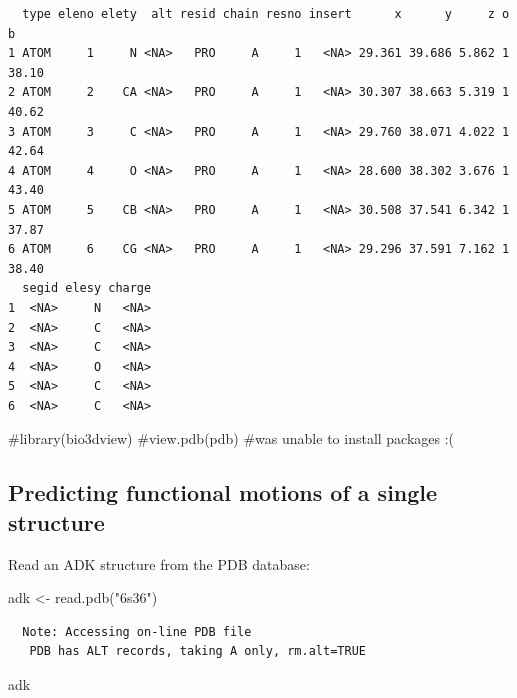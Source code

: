 \documentclass[
  letterpaper,
  DIV=11,
  numbers=noendperiod]{scrartcl}
\newenvironment{Shaded}{\begin{snugshade}}{\end{snugshade}}
\newcommand{\CommentTok}[1]{\textcolor[rgb]{0.37,0.37,0.37}{#1}}
\newcommand{\FunctionTok}[1]{\textcolor[rgb]{0.28,0.35,0.67}{#1}}
\newcommand{\NormalTok}[1]{\textcolor[rgb]{0.00,0.23,0.31}{#1}}
\newcommand{\OtherTok}[1]{\textcolor[rgb]{0.00,0.23,0.31}{#1}}
\newcommand{\StringTok}[1]{\textcolor[rgb]{0.13,0.47,0.30}{#1}}
\begin{document}
\begin{verbatim}
  type eleno elety  alt resid chain resno insert      x      y     z o     b
1 ATOM     1     N <NA>   PRO     A     1   <NA> 29.361 39.686 5.862 1 38.10
2 ATOM     2    CA <NA>   PRO     A     1   <NA> 30.307 38.663 5.319 1 40.62
3 ATOM     3     C <NA>   PRO     A     1   <NA> 29.760 38.071 4.022 1 42.64
4 ATOM     4     O <NA>   PRO     A     1   <NA> 28.600 38.302 3.676 1 43.40
5 ATOM     5    CB <NA>   PRO     A     1   <NA> 30.508 37.541 6.342 1 37.87
6 ATOM     6    CG <NA>   PRO     A     1   <NA> 29.296 37.591 7.162 1 38.40
  segid elesy charge
1  <NA>     N   <NA>
2  <NA>     C   <NA>
3  <NA>     C   <NA>
4  <NA>     O   <NA>
5  <NA>     C   <NA>
6  <NA>     C   <NA>
\end{verbatim}

\begin{Shaded}
\begin{Highlighting}[]
\CommentTok{\#library(bio3dview)}
\CommentTok{\#view.pdb(pdb)}
\CommentTok{\#was unable to install packages :(}
\end{Highlighting}
\end{Shaded}

\subsection{Predicting functional motions of a single
structure}\label{predicting-functional-motions-of-a-single-structure}

Read an ADK structure from the PDB database:

\begin{Shaded}
\begin{Highlighting}[]
\NormalTok{adk }\OtherTok{\textless{}{-}} \FunctionTok{read.pdb}\NormalTok{(}\StringTok{"6s36"}\NormalTok{)}
\end{Highlighting}
\end{Shaded}

\begin{verbatim}
  Note: Accessing on-line PDB file
   PDB has ALT records, taking A only, rm.alt=TRUE
\end{verbatim}

\begin{Shaded}
\begin{Highlighting}[]
\NormalTok{adk}
\end{Highlighting}
\end{Shaded}
\end{document}
